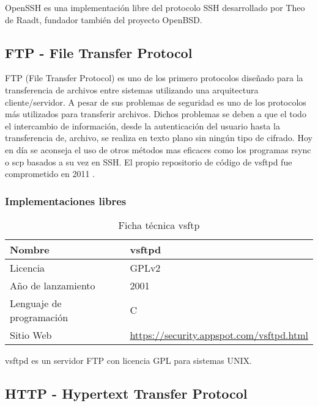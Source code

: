 OpenSSH es una implementación libre del protocolo SSH desarrollado por Theo de Raadt, fundador también del proyecto OpenBSD.

\subsection {FTP - File Transfer Protocol}

FTP (File Transfer Protocol) es uno de los primero protocolos diseñado para la transferencia de archivos entre sistemas utilizando una arquitectura cliente/servidor. A pesar de sus problemas de seguridad \cite{todd_why_2000} es uno de los protocolos más utilizados para transferir archivos. Dichos problemas se deben a que el todo el intercambio de información, desde la autenticación del usuario hasta la transferencia de, archivo, se realiza en texto plano sin ningún tipo de cifrado. Hoy en día se aconseja el uso de otros métodos mas eficaces como los programas rsync o scp basados a su vez en SSH. El propio repositorio de código de vsftpd fue comprometido en 2011 \cite{hkcert_security_bulletin_sa11070501_2011}.

\subsubsection {Implementaciones libres}

\begin{table}[H]
\begin{tabular}{|l|l|}
\hline
Nombre                   & vsftpd                       \\ \hline
Licencia                 & GPLv2                        \\ \hline
Año de lanzamiento       & 2001                         \\ \hline
Lenguaje de programación & C                            \\ \hline
Sitio Web                & \url{https://security.appspot.com/vsftpd.html} \\ \hline
\end{tabular}
\caption{Ficha técnica vsftp}
\end{table}

vsftpd es un servidor FTP con licencia GPL para sistemas UNIX.

\subsection {HTTP - Hypertext Transfer Protocol}

